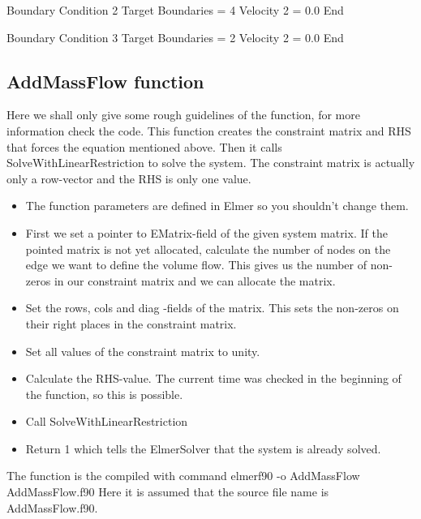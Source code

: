 Boundary Condition 2
  Target Boundaries = 4
  Velocity 2 = 0.0
End

Boundary Condition 3
  Target Boundaries = 2
  Velocity 2 = 0.0
End
\ttend
\subsection*{AddMassFlow function}
Here we shall only give some rough guidelines of the function, for more information
check the code. This function creates the constraint matrix and RHS that forces the
equation mentioned above. Then it calls SolveWithLinearRestriction to solve the system.
The constraint matrix is actually only a row-vector and the RHS is only one value. 
\begin{itemize}
\item The function parameters are defined in Elmer so you shouldn't change them.
\item First we set a pointer to EMatrix-field of the given system matrix.
If the pointed matrix is not yet allocated, calculate the number of nodes
on the edge we want to define the volume flow. This gives us the number of non-zeros
in our constraint matrix and we can allocate the matrix.
\item Set the rows, cols and diag -fields of the matrix. This sets the non-zeros
on their right places in the constraint matrix.
\item Set all values of the constraint matrix to unity.
\item Calculate the RHS-value. The current time was checked in the beginning 
of the function, so this is possible.
\item Call SolveWithLinearRestriction
\item Return 1 which tells the ElmerSolver that the system is already solved.
\end{itemize} 
The function is the compiled with command
\ttbegin
elmerf90 -o AddMassFlow AddMassFlow.f90 
\ttend
Here it is assumed that the source file name is AddMassFlow.f90.


